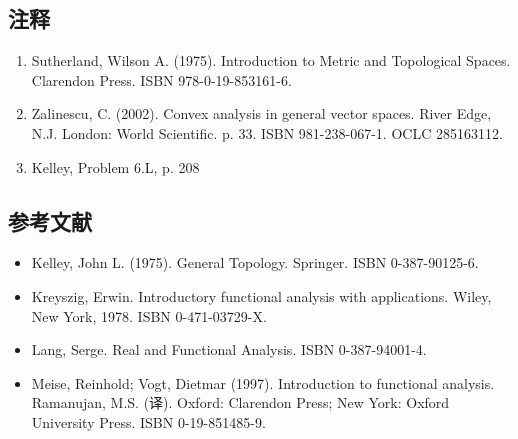 \subsection{注释}
\begin{enumerate}
\item Sutherland, Wilson A. (1975). Introduction to Metric and Topological Spaces. Clarendon Press. ISBN 978-0-19-853161-6.
\item Zalinescu, C. (2002). Convex analysis in general vector spaces. River Edge, N.J. London: World Scientific. p. 33. ISBN 981-238-067-1. OCLC 285163112.
\item Kelley, Problem 6.L, p. 208
\end{enumerate}
\subsection{参考文献}
\begin{itemize}
\item Kelley, John L. (1975). General Topology. Springer. ISBN 0-387-90125-6.
\item Kreyszig, Erwin. Introductory functional analysis with applications. Wiley, New York, 1978. ISBN 0-471-03729-X.
\item Lang, Serge. Real and Functional Analysis. ISBN 0-387-94001-4.
\item Meise, Reinhold; Vogt, Dietmar (1997). Introduction to functional analysis. Ramanujan, M.S. (译). Oxford: Clarendon Press; New York: Oxford University Press. ISBN 0-19-851485-9.
\end{itemize}
